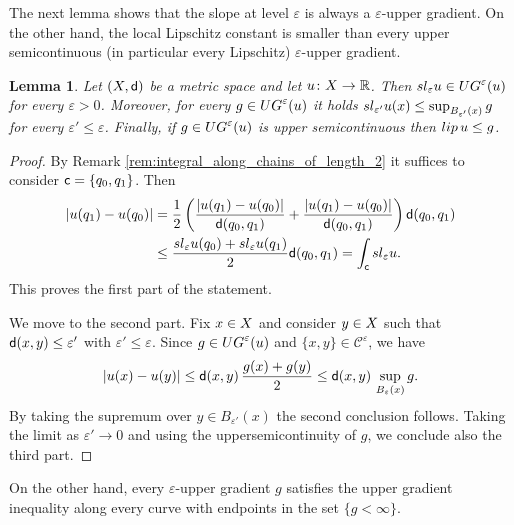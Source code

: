 \documentclass[12pt]{amsart}
\newcommand{\R}{\mathbb{R}}
\newcommand{\sfd}{{\sf d}}
\newcommand{\X}{{\rm X}}
\newcommand{\lip}{{\rm lip}}
\newtheorem{lemma}[theorem]{Lemma}
\newtheorem{proposition}[theorem]{Proposition}
\theoremstyle{definition}
\newcommand{\sfc}{{\sf c}}
\newcommand{\Chain}[1]{\mathscr{C}^{#1}}
\renewcommand{\sl}[1]{{\rm sl}_{#1}}
\newcommand{\UG}[1]{{\rm UG}^{#1}}
\begin{document}
%
The next lemma shows that the slope at level $\varepsilon$ is always a $\varepsilon$-upper gradient. On the other hand, the local Lipschitz constant is smaller than every upper semicontinuous (in particular every Lipschitz) $\varepsilon$-upper gradient.
\begin{lemma}
\label{lemma:slopeeps_epsug}
    Let $(\X,\sfd)$ be a metric space and let $u\colon \X \to \R$. Then $\sl{\varepsilon} u \in \UG{\varepsilon}(u)$ for every $\varepsilon > 0$. Moreover, for every $g\in \UG{\varepsilon}(u)$ it holds $\sl{\varepsilon'} u(x) \leq \sup_{B_{\varepsilon'}(x)} g$ for every $\varepsilon' \le \varepsilon$. Finally, if $g\in \UG{\varepsilon}(u)$ is upper semicontinuous then $\lip\, u \le g$.
\end{lemma}
\begin{proof}
    By Remark \ref{rem:integral_along_chains_of_length_2} it suffices to consider $\sfc = \{q_0,q_1\}$. Then
    \begin{equation}
    \begin{aligned}
         |u(q_{1}) - u(q_{0})| &= \frac{1}{2}\left( \frac{\vert u(q_{1}) - u(q_{0}) \vert}{\sfd(q_0,q_{1})} + \frac{\vert u(q_{1}) - u(q_{0}) \vert}{\sfd(q_0,q_{1})} \right)\sfd(q_0,q_{1})\\
        &\leq \frac{ \sl{\varepsilon} u(q_0) + \sl{\varepsilon} u(q_{1})}{2}\sfd(q_0,q_{1}) = \int_{\mathsf{c}} \sl{\varepsilon} u.
    \end{aligned}
    \end{equation}
    This proves the first part of the statement. 
    
    We move to the second part. Fix $x \in \X$ and consider $y\in \X$ such that $\sfd(x,y) \le \varepsilon'$ with $\varepsilon' \le \varepsilon$. Since $g\in \UG{\varepsilon}(u)$ and $\{x,y\} \in \Chain{\varepsilon}$, we have
    \begin{equation*}
        |u(x)-u(y)| \le \sfd(x,y)\,\frac{g(x)+g(y)}{2} \le \sfd(x,y)\,\sup_{B_\varepsilon(x)}g.
    \end{equation*}
    By taking the supremum over $y \in B_{\varepsilon'}(x)$ the second conclusion follows. Taking the limit as $\varepsilon' \to 0$ and using the uppersemicontinuity of $g$, we conclude also the third part.
\end{proof}
%
On the other hand, every $\varepsilon$-upper gradient $g$ satisfies the upper gradient inequality along every curve with endpoints in the set $\{g < \infty\}$. 
%
\end{document}
